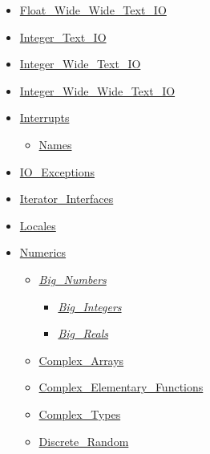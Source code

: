 \documentclass[english]{article}
\begin{document}
\begin{scriptsize}
\begin{multicols*}{5}
\begin{itemize}[leftmargin=0mm]
\begin{itemize}[leftmargin=5mm]
  \item[] \href{http://www.ada-auth.org/standards/22rm/html/RM-A-11.html}{Float\_Wide\_Wide\_Text\_IO}
  \item[] \href{http://www.ada-auth.org/standards/22rm/html/RM-A-10-8.html}{Integer\_Text\_IO}
  \item[] \href{http://www.ada-auth.org/standards/22rm/html/RM-A-11.html}{Integer\_Wide\_Text\_IO}
  \item[] \href{http://www.ada-auth.org/standards/22rm/html/RM-A-11.html}{Integer\_Wide\_Wide\_Text\_IO}
  \item[] \href{http://www.ada-auth.org/standards/22rm/html/RM-C-3-2.html}{Interrupts}
	\begin{itemize}[leftmargin=5mm]
	\item[] \href{http://www.ada-auth.org/standards/22rm/html/RM-C-3-2.html}{Names}
	\end{itemize}
  \item[] \href{http://www.ada-auth.org/standards/22rm/html/RM-A-13.html}{IO\_Exceptions}
  \item[] \href{http://www.ada-auth.org/standards/22rm/html/RM-5-5-1.html}{Iterator\_Interfaces}
  \item[] \href{http://www.ada-auth.org/standards/22rm/html/RM-A-19.html}{Locales}
  \item[] \href{http://www.ada-auth.org/standards/22rm/html/RM-A-5.html}{Numerics}
	\begin{itemize}[leftmargin=5mm]
	\item[] \href{http://www.ada-auth.org/standards/22rm/html/RM-A-5-5.html}{\textit{Big\_Numbers}}
	  \begin{itemize}[leftmargin=5mm]
	  \item[] \href{http://www.ada-auth.org/standards/22rm/html/RM-A-5-6.html}{\textit{Big\_Integers}}
	  \item[] \href{http://www.ada-auth.org/standards/22rm/html/RM-A-5-7.html}{\textit{Big\_Reals}}
	  \end{itemize}
	\item[] \href{http://www.ada-auth.org/standards/22rm/html/RM-G-3-2.html}{Complex\_Arrays}
	\item[] \href{http://www.ada-auth.org/standards/22rm/html/RM-G-1-2.html}{Complex\_Elementary\_Functions}
	\item[] \href{http://www.ada-auth.org/standards/22rm/html/RM-G-1-1.html}{Complex\_Types}
	\item[] \href{http://www.ada-auth.org/standards/22rm/html/RM-A-5-2.html}{Discrete\_Random}

\end{itemize}
\end{itemize}
\end{itemize}
\end{multicols*}
\end{scriptsize}
\end{document}
